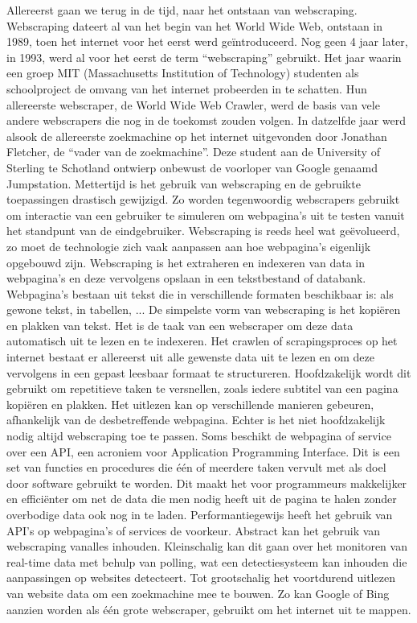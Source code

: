Allereerst gaan we terug in de tijd, naar het ontstaan van webscraping. Webscraping dateert al van het begin van het World Wide Web, ontstaan in 1989, toen het internet voor het eerst werd geïntroduceerd. Nog geen 4 jaar later, in 1993, werd al voor het eerst de term “webscraping” gebruikt. Het jaar waarin een groep MIT (Massachusetts Institution of Technology) studenten als schoolproject de omvang van het internet probeerden in te schatten. Hun allereerste webscraper, de World Wide Web Crawler, werd de basis van vele andere webscrapers die nog in de toekomst zouden volgen. In datzelfde jaar werd alsook de allereerste zoekmachine op het internet uitgevonden door Jonathan Fletcher, de “vader van de zoekmachine”. Deze student aan de University of Sterling te Schotland ontwierp onbewust de voorloper van Google genaamd Jumpstation. \autocite{farholt2021less} Mettertijd is het gebruik van webscraping en de gebruikte toepassingen drastisch gewijzigd. Zo worden tegenwoordig webscrapers gebruikt om interactie van een gebruiker te simuleren om webpagina’s uit te testen vanuit het standpunt van de eindgebruiker.
Webscraping is reeds heel wat geëvolueerd, zo moet de technologie zich vaak aanpassen aan hoe webpagina’s eigenlijk opgebouwd zijn.
Webscraping is het extraheren en indexeren van data in webpagina’s en deze vervolgens opslaan in een tekstbestand of databank. Webpagina’s bestaan uit tekst die in verschillende formaten beschikbaar is: als gewone tekst, in tabellen, ... De simpelste vorm van webscraping is het kopiëren en plakken van tekst. Het is de taak van een webscraper om deze data automatisch uit te lezen en te indexeren. Het crawlen of scrapingsproces op het internet bestaat er allereerst uit alle gewenste data uit te lezen en om deze vervolgens in een gepast leesbaar formaat te structureren.\autocite{zhao2017web} Hoofdzakelijk wordt dit gebruikt om repetitieve taken te versnellen, zoals iedere subtitel van een pagina kopiëren en plakken. Het uitlezen kan op verschillende manieren gebeuren, afhankelijk van de desbetreffende webpagina. Echter is het niet hoofdzakelijk nodig altijd webscraping toe te passen. Soms beschikt de webpagina of service over een API, een acroniem voor Application Programming Interface. Dit is een set van functies en procedures  die één of meerdere taken vervult met als doel door software gebruikt te worden. Dit maakt het voor programmeurs makkelijker en efficiënter om net de data die men nodig heeft uit de pagina te halen zonder overbodige data ook nog in te laden. Performantiegewijs heeft het gebruik van API’s op webpagina’s of services de voorkeur. \autocite{10.2307/251584}
Abstract kan het gebruik van webscraping vanalles inhouden. Kleinschalig kan dit gaan over het monitoren van real-time data met behulp van polling, wat een detectiesysteem kan inhouden die aanpassingen op websites detecteert. Tot grootschalig het voortdurend uitlezen van website data om een zoekmachine mee te bouwen. Zo kan Google of Bing aanzien worden als één grote webscraper, gebruikt om het internet uit te mappen. \autocite{snyder2003web}

